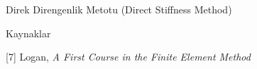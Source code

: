 \documentclass[12pt,fleqn]{article}\usepackage{../../common}
\begin{document}
Direk Direngenlik Metotu (Direct Stiffness Method)




Kaynaklar

[7] Logan, {\em A First Course in the Finite Element Method}
\end{document}

